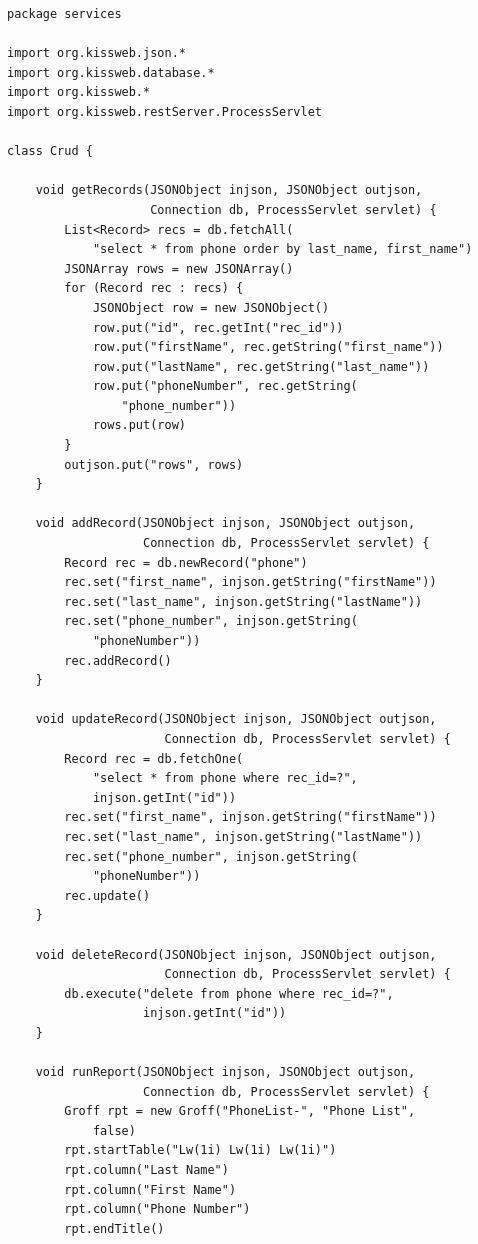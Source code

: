 \begin{lstlisting}[style=groovy]
package services

import org.kissweb.json.*
import org.kissweb.database.*
import org.kissweb.*
import org.kissweb.restServer.ProcessServlet

class Crud {

    void getRecords(JSONObject injson, JSONObject outjson,
                    Connection db, ProcessServlet servlet) {
        List<Record> recs = db.fetchAll(
            "select * from phone order by last_name, first_name")
        JSONArray rows = new JSONArray()
        for (Record rec : recs) {
            JSONObject row = new JSONObject()
            row.put("id", rec.getInt("rec_id"))
            row.put("firstName", rec.getString("first_name"))
            row.put("lastName", rec.getString("last_name"))
            row.put("phoneNumber", rec.getString(
                "phone_number"))
            rows.put(row)
        }
        outjson.put("rows", rows)
    }

    void addRecord(JSONObject injson, JSONObject outjson,
                   Connection db, ProcessServlet servlet) {
        Record rec = db.newRecord("phone")
        rec.set("first_name", injson.getString("firstName"))
        rec.set("last_name", injson.getString("lastName"))
        rec.set("phone_number", injson.getString(
            "phoneNumber"))
        rec.addRecord()
    }

    void updateRecord(JSONObject injson, JSONObject outjson,
                      Connection db, ProcessServlet servlet) {
        Record rec = db.fetchOne(
            "select * from phone where rec_id=?",
            injson.getInt("id"))
        rec.set("first_name", injson.getString("firstName"))
        rec.set("last_name", injson.getString("lastName"))
        rec.set("phone_number", injson.getString(
            "phoneNumber"))
        rec.update()
    }

    void deleteRecord(JSONObject injson, JSONObject outjson,
                      Connection db, ProcessServlet servlet) {
        db.execute("delete from phone where rec_id=?",
                   injson.getInt("id"))
    }

    void runReport(JSONObject injson, JSONObject outjson,
                   Connection db, ProcessServlet servlet) {
        Groff rpt = new Groff("PhoneList-", "Phone List",
            false)
        rpt.startTable("Lw(1i) Lw(1i) Lw(1i)")
        rpt.column("Last Name")
        rpt.column("First Name")
        rpt.column("Phone Number")
        rpt.endTitle()


\end{lstlisting}
